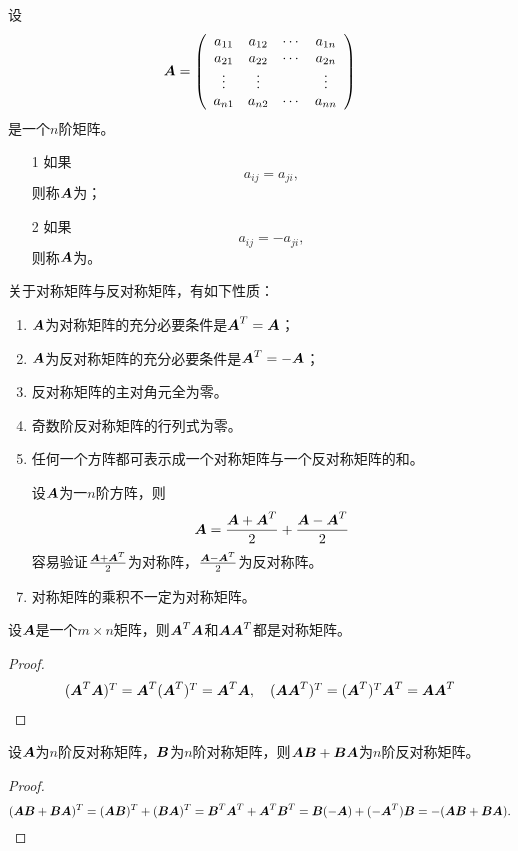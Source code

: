 \begin{dingyi}
  设
  $$
  \A = \left(
    \begin{array}{cccc}
      a_{11} & a_{12} & \cd & a_{1n} \\
      a_{21} & a_{22} & \cd & a_{2n} \\
      \vd   & \vd &  & \vd \\
      a_{n1} & a_{n2} & \cd & a_{nn} 
    \end{array}
  \right)
  $$
  是一个$n$阶矩阵。
  \begin{itemize}
  \item[1]
    如果
    $$
    a_{ij} = a_{ji},
    $$
    则称$\A$为；
  \item[2]
    如果
    $$
    a_{ij} = -a_{ji},
    $$
    则称$\A$为。
  \end{itemize}      
\end{dingyi}

\begin{zhu*}
  关于对称矩阵与反对称矩阵，有如下性质：
  \begin{enumerate}
  \item $\A$为对称矩阵的充分必要条件是$\A^T=\A$；
  \item $\A$为反对称矩阵的充分必要条件是$\A^T=-\A$；
  \item 反对称矩阵的主对角元全为零。 
  \item 奇数阶反对称矩阵的行列式为零。
  \item 任何一个方阵都可表示成一个对称矩阵与一个反对称矩阵的和。
  \item[]  设$\A$为一$n$阶方阵，则
    $$
    \A = \frac{\A+\A^T}2 + \frac{\A-\A^T}2
    $$
    容易验证$\frac{\A+\A^T}2$为对称阵，$\frac{\A-\A^T}2$为反对称阵。 
  \item 对称矩阵的乘积不一定为对称矩阵。
  \item[]  
  \end{enumerate}
\end{zhu*}

\begin{li}
  设$\A$是一个$m\times n$矩阵，则$\A^T\A$和$\A\A^T$都是对称矩阵。      
\end{li}

\begin{proof}
  $$
  \begin{array}{l}
    (\A^T\A)^T  = \A^T(\A^T)^T  = \A^T \A, \quad
    (\A\A^T)^T  = (\A^T)^T\A^T  = \A \A^T
  \end{array}
  $$
\end{proof}

\begin{li}
  设$\A$为$n$阶反对称矩阵，$\B$为$n$阶对称矩阵，则$\A\B+\B\A$为$n$阶反对称矩阵。
\end{li}
\begin{proof}
  $$
  (\A\B+\B\A)^T =(\A\B)^T+(\B\A)^T  = \B^T\A^T+\A^T\B^T 
  = \B(-\A) + (-\A^T)\B  = - (\A\B+\B\A).      
  $$  
\end{proof}%

